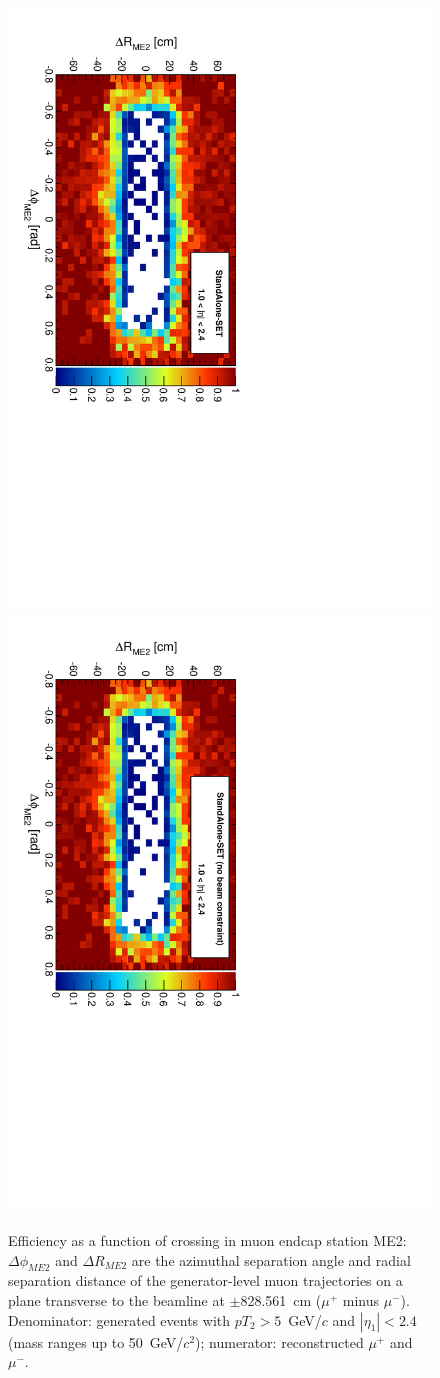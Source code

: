 \documentclass[12pt]{article}
\begin{document}
\begin{figure}[p]
\includegraphics[height=0.5\linewidth, angle=90]{fig/acceptance7_plot/me2_StandAloneUpdatedSET.pdf}
\includegraphics[height=0.5\linewidth, angle=90]{fig/acceptance7_plot/me2_StandAloneSET.pdf}

\caption{Efficiency as a function of crossing in muon endcap station
  ME2: $\Delta\phi_{ME2}$ and $\Delta R_{ME2}$ are the azimuthal
  separation angle and radial separation distance of the
  generator-level muon trajectories on a plane transverse to the
  beamline at $\pm$828.561~cm ($\mu^+$ minus $\mu^-$).  Denominator:
  generated events with $pT_2 > 5$~GeV/$c$ and $|\eta_1| < 2.4$ (mass
  ranges up to 50~GeV/$c^2$); numerator: reconstructed $\mu^+$ and
  $\mu^-$. \label{fig:me2}}
\end{figure}
\end{document}
